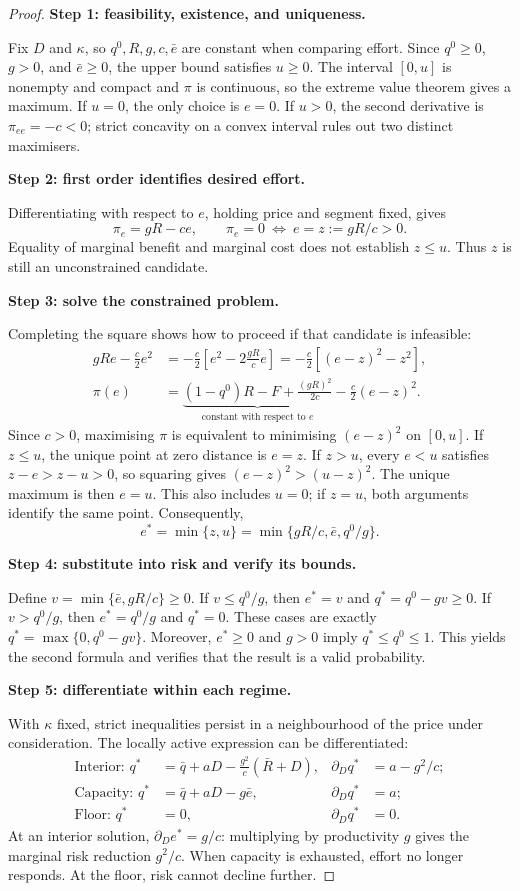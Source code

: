 \documentclass[11pt]{article}
\theoremstyle{definition}\newtheorem{assumption}{Assumption}
\begin{document}
\begin{proof}
\textbf{Step 1: feasibility, existence, and uniqueness.}\par
Fix $D$ and $\kappa$, so $q^0,R,g,c,\bar e$ are constant when comparing
effort. Since $q^0\ge0$, $g>0$, and $\bar e\ge0$, the upper bound satisfies
$u\ge0$. The interval $[0,u]$ is nonempty and compact and $\pi$ is
continuous, so the extreme value theorem gives a maximum. If $u=0$, the
only choice is $e=0$. If $u>0$, the second derivative is $\pi_{ee}=-c<0$;
strict concavity on a convex interval rules out two distinct maximisers.

\textbf{Step 2: first order identifies desired effort.}\par
Differentiating with respect to $e$, holding price and segment fixed, gives
\[
\pi_e=gR-ce,\qquad \pi_e=0\ \Longleftrightarrow\ e=z:=gR/c>0.
\]
Equality of marginal benefit and marginal cost does not establish $z\le u$.
Thus $z$ is still an unconstrained candidate.

\textbf{Step 3: solve the constrained problem.}\par
Completing the square shows how to proceed if that candidate is infeasible:
\begin{align*}
gRe-\frac c2e^2
 &=-\frac c2\left[e^2-2\frac{gR}{c}e\right]
  =-\frac c2\left[(e-z)^2-z^2\right],\\
\pi(e)&=\underbrace{(1-q^0)R-F+\frac{(gR)^2}{2c}}_{\text{constant with respect to }e}
              -\frac c2(e-z)^2.
\end{align*}
Since $c>0$, maximising $\pi$ is equivalent to minimising $(e-z)^2$ on
$[0,u]$. If $z\le u$, the unique point at zero distance is $e=z$.
If $z>u$, every $e<u$ satisfies $z-e>z-u>0$, so squaring gives
$(e-z)^2>(u-z)^2$. The unique maximum is then $e=u$. This also includes
$u=0$; if $z=u$, both arguments identify the same point. Consequently,
\[
e^*=\min\{z,u\}=\min\{gR/c,\bar e,q^0/g\}.
\]

\textbf{Step 4: substitute into risk and verify its bounds.}\par
Define $v=\min\{\bar e,gR/c\}\ge0$. If $v\le q^0/g$, then $e^*=v$ and
$q^*=q^0-gv\ge0$. If $v>q^0/g$, then $e^*=q^0/g$ and $q^*=0$.
These cases are exactly $q^*=\max\{0,q^0-gv\}$. Moreover, $e^*\ge0$ and
$g>0$ imply $q^*\le q^0\le1$. This yields the second formula and verifies
that the result is a valid probability.

\textbf{Step 5: differentiate within each regime.}\par
With $\kappa$ fixed, strict inequalities persist in a neighbourhood of the
price under consideration. The locally active expression can be differentiated:
\begin{align*}
\text{Interior: }q^*&=\bar q+aD-\frac{g^2}{c}(\bar R+D),
 &\partial_Dq^*&=a-g^2/c;\\
\text{Capacity: }q^*&=\bar q+aD-g\bar e,
 &\partial_Dq^*&=a;\\
\text{Floor: }q^*&=0,
 &\partial_Dq^*&=0.
\end{align*}
At an interior solution, $\partial_De^*=g/c$: multiplying by productivity
$g$ gives the marginal risk reduction $g^2/c$. When capacity is exhausted,
effort no longer responds. At the floor, risk cannot decline further.


\end{proof}
\end{document}
